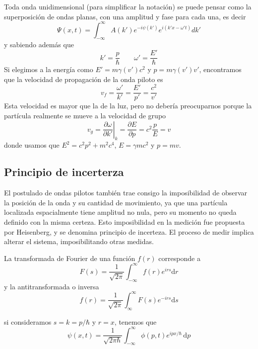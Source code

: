 \documentclass{book}
\numberwithin{equation}{section} %
\begin{document}
Toda onda unidimensional (para simplificar la notación) se puede pensar como la superposición de ondas planas, con una amplitud y fase para cada una, es decir
\begin{equation}
    \Psi(x,t) = \int_{-\infty}^{\infty} A(k') e^{-i\psi(k')} e^{i (k' x - \omega' t)} dk'
\end{equation}
y sabiendo además que
\[ k' = \frac{p}{\hbar} \qquad \omega' = \frac{E'}{\hbar}\]
Si elegimos a la energía como $E' = m \gamma(v') c^2$ y $p = m \gamma(v') v'$, encontramos que la velocidad de propagación de la onda piloto es
\begin{equation}
    v_f = \frac{\omega'}{k'} = \frac{E'}{p'} = \frac{c^2}{v'}
\end{equation}
Esta velocidad es mayor que la de la luz, pero no debería preocuparnos porque la partícula realmente se mueve a la velocidad de grupo
\begin{equation}
    v_g = \left.\frac{\partial \omega}{\partial k'}\right|_k = \frac{\partial E}{\partial p} = c^2 \frac{p}{E} = v
\end{equation}
donde usamos que $E^2 = c^2 p^2 + m^2 c^4$, $E = \gamma m c^2$ y $p = m v$.

\subsection{Principio de incerterza}
El postulado de ondas pilotos también trae consigo la imposibilidad de observar la posición de la onda y su cantidad de movimiento, ya que una partícula localizada espacialmente tiene amplitud no nula, pero su momento no queda definido con la misma certeza.
Esto imposibilidad en la medición fue propuesta por Heisenberg, y se denomina principio de incerteza. 
El proceso de medir implica alterar el sistema, imposibilitando otras medidas.

La transformada de Fourier de una función $f(r)$ corresponde a
\begin{equation}
    F(s) = \frac{1}{\sqrt{2\pi}} \int_{-\infty}^{\infty} f(r) e^{i r s} \mathrm{d}r
\end{equation}
y la antitransformada o inversa
\begin{equation}
    f(r) = \frac{1}{\sqrt{2\pi}} \int_{\infty}^{\infty} F(s) e^{- i r s} \mathrm{d}s
\end{equation}

si consideramos $s = k = p/\hbar$ y $r = x$, tenemos que
\begin{equation}
    \psi(x, t) = \frac{1}{\sqrt{2 \pi \hbar}} \int_{-\infty}^{\infty} \phi(p, t) e^{i p x/\hbar}\, \mathrm{d}p
\end{equation}
\end{document}
